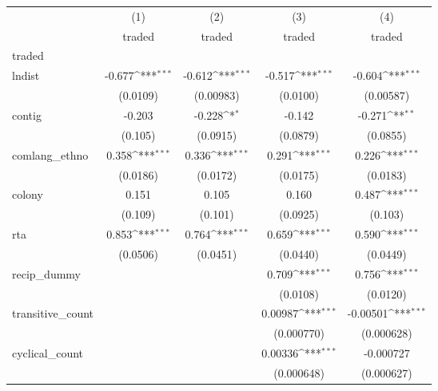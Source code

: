 {
\def\sym#1{\ifmmode^{#1}\else\(^{#1}\)\fi}
\begin{tabular}{l*{4}{c}}
\hline\hline
          &\multicolumn{1}{c}{(1)}&\multicolumn{1}{c}{(2)}&\multicolumn{1}{c}{(3)}&\multicolumn{1}{c}{(4)}\\
          &\multicolumn{1}{c}{traded}&\multicolumn{1}{c}{traded}&\multicolumn{1}{c}{traded}&\multicolumn{1}{c}{traded}\\
\hline
traded    &                  &                  &                  &                  \\
lndist    &   -0.677\sym{***}&   -0.612\sym{***}&   -0.517\sym{***}&   -0.604\sym{***}\\
          & (0.0109)         &(0.00983)         & (0.0100)         &(0.00587)         \\
[1em]
contig    &   -0.203         &   -0.228\sym{*}  &   -0.142         &   -0.271\sym{**} \\
          &  (0.105)         & (0.0915)         & (0.0879)         & (0.0855)         \\
[1em]
comlang\_ethno&    0.358\sym{***}&    0.336\sym{***}&    0.291\sym{***}&    0.226\sym{***}\\
          & (0.0186)         & (0.0172)         & (0.0175)         & (0.0183)         \\
[1em]
colony    &    0.151         &    0.105         &    0.160         &    0.487\sym{***}\\
          &  (0.109)         &  (0.101)         & (0.0925)         &  (0.103)         \\
[1em]
rta       &    0.853\sym{***}&    0.764\sym{***}&    0.659\sym{***}&    0.590\sym{***}\\
          & (0.0506)         & (0.0451)         & (0.0440)         & (0.0449)         \\
[1em]
recip\_dummy&                  &                  &    0.709\sym{***}&    0.756\sym{***}\\
          &                  &                  & (0.0108)         & (0.0120)         \\
[1em]
transitive\_count&                  &                  &  0.00987\sym{***}& -0.00501\sym{***}\\
          &                  &                  &(0.000770)         &(0.000628)         \\
[1em]
cyclical\_count&                  &                  &  0.00336\sym{***}&-0.000727         \\
          &                  &                  &(0.000648)         &(0.000627)         \\

\end{tabular}}
